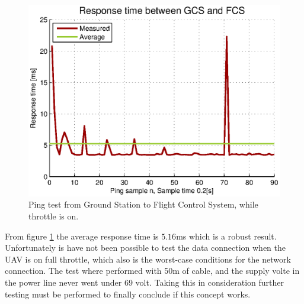 \begin{figure}[hbtp]
\centering
\includegraphics[scale=1]{graphics/pingTest.eps}
\caption{Ping test from Ground Station to Flight Control System, while throttle is on.}
\label{fig:pingTest}
\end{figure}

\noindent
From figure \ref{fig:pingTest} the average response time is $5.16$ms which is a robust result. Unfortunately is have not been possible to test the data connection when the UAV is on full throttle, which also is the worst-case conditions for the network connection. The test where performed with 50m of cable, and the supply volte in the power line never went under 69 volt. Taking this in consideration further testing must be performed to finally conclude if this concept works. 


